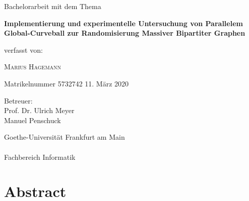 \documentclass[a4paper,twoside, 11pt, openright]{scrbook}
\theoremstyle{plain} %
\theoremstyle{definition} %
\begin{document}
\parindent0mm


\begin{titlepage}
	\centering
	{\LARGE Bachelorarbeit mit dem Thema\par}
	\vfill
	{\huge\bfseries Implementierung und experimentelle Untersuchung 
					von Parallelem Global-Curveball zur Randomisierung
					Massiver Bipartiter Graphen\par}
	\vspace{2.5cm}
	{\Large verfasst von: \par}
	\vspace{1cm}
	{\LARGE \scshape Marius Hagemann\par}
	\vspace{0.5cm}
	{\large Matrikelnummer 5732742 }
	\vfill
	{\Large 11. März 2020}
	\vfill
	{\LARGE Betreuer:\\ Prof. Dr. Ulrich Meyer \\ Manuel Penschuck\par}
	\vspace{1.5cm}
	{\LARGE Goethe-Universität Frankfurt am Main \\ ~\\ Fachbereich Informatik}
\end{titlepage}


\cleardoublepage 
\thispagestyle{empty}

\newpage





\newpage
\tableofcontents




\chapter*{Abstract}



\end{document}
